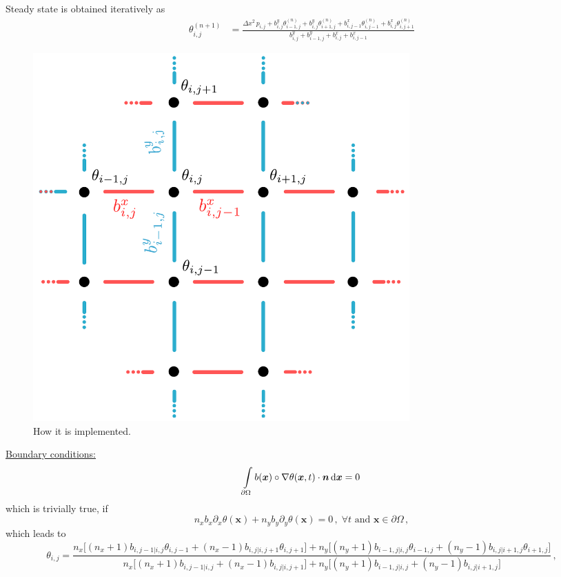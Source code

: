 \documentclass[notitlepage]{revtex4-2}
\begin{document}
Steady state is obtained  iteratively as
\begin{align}
\theta_{i,j}^{(n+1)} &= \frac{\Delta x^2\,p_{i,j} + b^y_{i,j}\theta_{i-1,j}^{(n)}
+b^y_{i,j}\theta_{i+1,j}^{(n)}+b^x_{i,j-1}\theta_{i,j-1}^{(n)}
+b^x_{i,j}\theta_{i,j+1}^{(n)}}
{b^y_{i,j}+b^y_{i-1,j}+b^x_{i,j}+b^x_{i,j-1}}
\end{align}



\begin{figure}
\includegraphics[width=0.7\textwidth]{figures/lattice_implementation.pdf}
\caption{How it is implemented.}
\end{figure}

\underline{Boundary conditions:}\\
\begin{equation}
\intop_{\partial \Omega}b(\bm x)\circ\nabla \theta(\bm x,t)\cdot\bm n\, {\rm d}\bm x  = 0 
\end{equation}
which is trivially true, if
\begin{equation}
n_xb_x\partial_x \theta(\bm x) + n_yb_y\partial_y \theta(\bm x) = 0\,,\; \forall t \text{ and } \bm x \in \partial \Omega \,,
\end{equation}
which leads to
\begin{equation}
\theta_{i,j} = \frac{n_x\big[(n_x+1)b_{i,j-1|i,j}\theta_{i,j-1}+(n_x-1)b_{i,j|i,j+1}\theta_{i,j+1}\big]+
n_y\big[(n_y+1)b_{i-1,j|i,j}\theta_{i-1,j}+(n_y-1)b_{i,j|i+1,j}\theta_{i+1,j}\big]}
{n_x\big[(n_x+1)b_{i,j-1|i,j}+(n_x-1)b_{i,j|i,j+1}\big]+n_y\big[(n_y+1)b_{i-1,j|i,j}+(n_y-1)b_{i,j|i+1,j}\big]}\,,
\end{equation}
\end{document}
